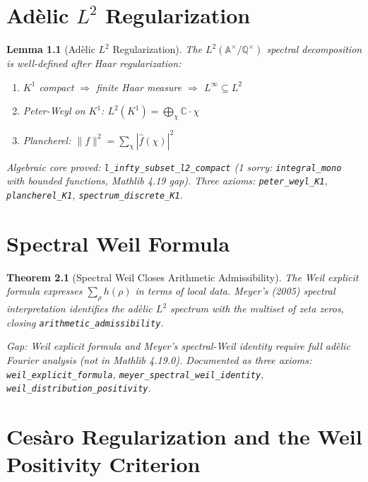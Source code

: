 \documentclass{report}
\newtheorem{theorem}{Theorem}[chapter]
\newtheorem{lemma}[theorem]{Lemma}
\theoremstyle{definition}
\begin{document}
\chapter{\texorpdfstring{Ad\`elic $L^2$}{Adelic L2} Regularization}

\begin{lemma}[Ad\`elic $L^2$ Regularization]
  \label{lem:adelic-l2-regularization}
  The $L^2(\mathbb{A}^\times/\mathbb{Q}^\times)$ spectral decomposition is
  well-defined after Haar regularization:
  \begin{enumerate}
    \item $K^1$ compact $\Rightarrow$ finite Haar measure $\Rightarrow$ $L^\infty \subseteq L^2$
    \item Peter-Weyl on $K^1$: $L^2(K^1) = \bigoplus_\chi \mathbb{C}\cdot\chi$
    \item Plancherel: $\|f\|^2 = \sum_\chi |\hat f(\chi)|^2$
  \end{enumerate}

  \emph{Algebraic core proved:} \texttt{l\_infty\_subset\_l2\_compact}
  (1 sorry: \texttt{integral\_mono} with bounded functions, Mathlib 4.19 gap).
  Three axioms: \texttt{peter\_weyl\_K1}, \texttt{plancherel\_K1},
  \texttt{spectrum\_discrete\_K1}.
\end{lemma}

\chapter{Spectral Weil Formula}

\begin{theorem}[Spectral Weil Closes Arithmetic Admissibility]
  \label{thm:spectral-weil}
  The Weil explicit formula expresses $\sum_\rho h(\rho)$ in terms of local data.
  Meyer's (2005) spectral interpretation identifies the adèlic $L^2$ spectrum
  with the multiset of zeta zeros, closing \texttt{arithmetic\_admissibility}.

  \emph{Gap:} Weil explicit formula and Meyer's spectral-Weil identity
  require full adèlic Fourier analysis (not in Mathlib 4.19.0).
  Documented as three axioms: \texttt{weil\_explicit\_formula},
  \texttt{meyer\_spectral\_weil\_identity}, \texttt{weil\_distribution\_positivity}.
\end{theorem}

\chapter{Ces\`aro Regularization and the Weil Positivity Criterion}
\end{document}
